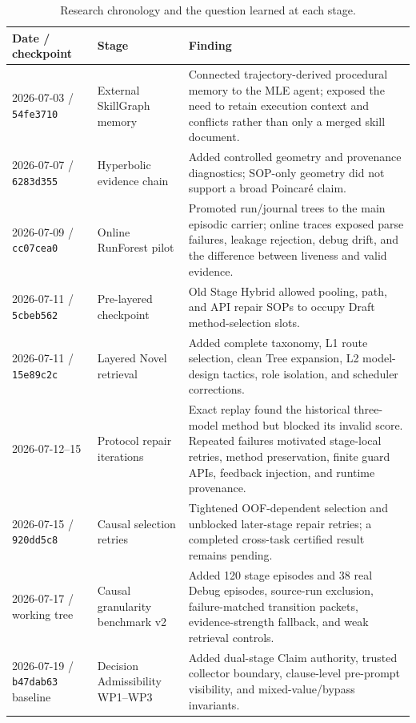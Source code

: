 \documentclass{article}
\begin{document}
\begin{table}[h]
\caption{Research chronology and the question learned at each stage.}
\label{tab:chronology}
\centering
\small
\begin{tabular}{p{}p{}p{}}
\toprule
Date / checkpoint & Stage & Finding \\
\midrule
2026-07-03 / \texttt{54fe3710} & External SkillGraph memory & Connected trajectory-derived procedural memory to the MLE agent; exposed the need to retain execution context and conflicts rather than only a merged skill document. \\
2026-07-07 / \texttt{6283d355} & Hyperbolic evidence chain & Added controlled geometry and provenance diagnostics; SOP-only geometry did not support a broad Poincar\'e claim. \\
2026-07-09 / \texttt{cc07cea0} & Online RunForest pilot & Promoted run/journal trees to the main episodic carrier; online traces exposed parse failures, leakage rejection, debug drift, and the difference between liveness and valid evidence. \\
2026-07-11 / \texttt{5cbeb562} & Pre-layered checkpoint & Old Stage Hybrid allowed pooling, path, and API repair SOPs to occupy Draft method-selection slots. \\
2026-07-11 / \texttt{15e89c2c} & Layered Novel retrieval & Added complete taxonomy, L1 route selection, clean Tree expansion, L2 model-design tactics, role isolation, and scheduler corrections. \\
2026-07-12--15 & Protocol repair iterations & Exact replay found the historical three-model method but blocked its invalid score.  Repeated failures motivated stage-local retries, method preservation, finite guard APIs, feedback injection, and runtime provenance. \\
2026-07-15 / \texttt{920dd5c8} & Causal selection retries & Tightened OOF-dependent selection and unblocked later-stage repair retries; a completed cross-task certified result remains pending. \\
2026-07-17 / working tree & Causal granularity benchmark v2 & Added 120 stage episodes and 38 real Debug episodes, source-run exclusion, failure-matched transition packets, evidence-strength fallback, and weak retrieval controls. \\
2026-07-19 / \texttt{b47dab63} baseline & Decision Admissibility WP1--WP3 & Added dual-stage Claim authority, trusted collector boundary, clause-level pre-prompt visibility, and mixed-value/bypass invariants. \\

\end{tabular}
\end{table}
\end{document}
